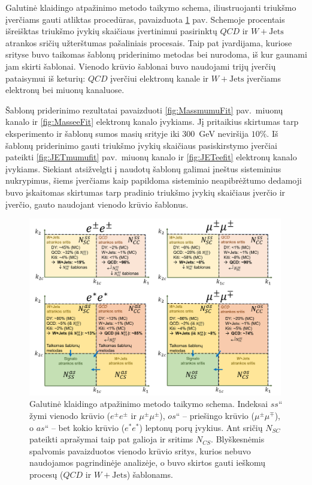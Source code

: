 \documentclass[a4paper, 12pt, oneside]{article}
\newcommand{\WJets}{W\! +\!\mathrm{Jets}}
\newcommand{\ltq}[1]{{\quotedblbase{}#1\textquotedblleft{}}}
\newcommand{\QCD}{QC\! D}
\newlength\q
\begin{document}
Galutinė klaidingo atpažinimo metodo taikymo schema, iliustruojanti triukšmo įverčiams gauti atliktas procedūras, pavaizduota
\ref{fig:FRfinal} pav.
Schemoje procentais išreišktas triukšmo įvykių skaičiaus įvertinimui pasirinktų $\QCD$ ir $\WJets$ atrankos sričių užterštumas
pašaliniais procesais.
Taip pat įvardijama, kuriose srityse buvo taikomas šablonų priderinimo metodas bei nurodoma, iš kur gaunami jam skirti šablonai.
Vienodo krūvio šablonai buvo naudojami trijų įverčių pataisymui iš keturių: $\QCD$ įverčiui elektronų kanale ir $\WJets$ įverčiams
elektronų bei miuonų kanaluose.

Šablonų priderinimo rezultatai pavaizduoti \ref{fig:MassmumuFit} pav.\ miuonų kanalo ir \ref{fig:MasseeFit} elektronų kanalo įvykiams.
Jį pritaikius skirtumas tarp eksperimento ir šablonų sumos masių srityje iki $300$~GeV neviršija $10\%$.
Iš šablonų priderinimo gauti triukšmo įvykių skaičiaus pasiskirstymo įverčiai pateikti \ref{fig:JETmumufit} pav.\ miuonų kanalo
ir \ref{fig:JETeefit} elektronų kanalo įvykiams.
Siekiant atsižvelgti į naudotų šablonų galimai įneštus sisteminius nukrypimus, šiems įverčiams kaip papildoma sisteminio neapibrėžtumo
dedamoji buvo įskaitomas skirtumas tarp pradinio triukšmo įvykių skaičiaus įverčio ir įverčio, gauto naudojant vienodo krūvio
šablonus.

\begin{figure}[t!]
	\RawFloats\centering
	\includegraphics[width=0.99\textwidth]{Magistrinis/FRtaikymas_ssos.png}
	\caption{\label{fig:FRfinal}
		Galutinė klaidingo atpažinimo metodo taikymo schema.
		Indeksai \ltq{$ss$} žymi vienodo krūvio ($e^\pm e^\pm$ ir $\mu^\pm \mu^\pm$), \ltq{$os$} -- priešingo krūvio ($\mu^\pm\mu^\mp$),
		o \ltq{$as$} -- bet kokio krūvio ($e^*e^*$) leptonų porų įvykius.
		Ant sričių $N_{SC}$ pateikti aprašymai taip pat galioja ir sritims $N_{CS}$.
		Blyškesnėmis spalvomis pavaizduotos vienodo krūvio sritys, kurios nebuvo naudojamos pagrindinėje analizėje, o buvo skirtos
		gauti ieškomų procesų ($\QCD$ ir $\WJets$) šablonams.}
\end{figure}
\end{document}
